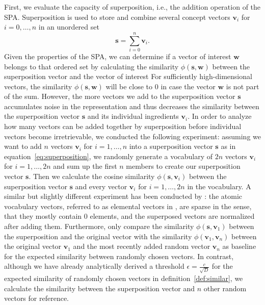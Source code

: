 First, we evaluate the capacity of superposition, i.e., the addition operation of the \ac{SPA}.
Superposition is used to store and combine several concept vectors $ \mathbf{v}_i$ for $i=0, \ldots, n$ in an unordered set
\begin{equation}
\label{eq:superposition}
\mathbf{s} = \sum\limits_{i=0}^{n} \mathbf{v}_{i}.
\end{equation}
Given the properties of the \ac{SPA}, we can determine if a vector of interest $\mathbf{w}$ belongs to that ordered set by calculating the similarity $\phi\left( \mathbf{s}, \mathbf{w}\right)$ between the superposition vector and the vector of interest
For sufficiently high-dimensional vectors, the similarity $\phi\left( \mathbf{s}, \mathbf{w}\right)$ will be close to \num{0} in case the vector $ \mathbf{w}$ is not part of the sum.
However, the more vectors we add to the superposition vector $ \mathbf{s}$ accumulates noise in the representation and thus decreases the similarity between the superposition vector $ \mathbf{s}$ and its individual ingredients $ \mathbf{v}_i$.
In order to analyze how many vectors can be added together by superposition before individual vectors become irretrievable, we conducted the following experiment: assuming we want to add $n$ vectors $ \mathbf{v}_i$ for $i=1, \ldots, n$ into a superposition vector $ \mathbf{s}$ as in equation~\eqref{eq:superposition}, we randomly generate a vocabulary of $2n$ vectors $ \mathbf{v}_i$ for $i=1, \ldots, 2n$ and sum up the first $n$ members to create our superposition vector $ \mathbf{s}$.
Then we calculate the cosine similarity $\phi\left(\mathbf{s}, \mathbf{v}_i\right)$ between the superposition vector $ \mathbf{s}$ and every vector $ \mathbf{v}_{i}$ for $i=1,\ldots, 2n$ in the vocabulary.
A similar but slightly different experiment has been conducted by \textcite{Wahle2012}: the atomic vocabulary vectors,  referred to as elemental vectors in \textcite{Wahle2012}, are sparse in the sense, that they mostly contain \num{0} elements, and the superposed vectors are normalized after adding them.
Furthermore, \textcite{Wahle2012} only compare the similarity $\phi\left(\mathbf{s}, \mathbf{v}_1\right)$ between the superposition and the original vector with the similarity $\phi\left(\mathbf{v}_1, \mathbf{v}_n\right)$ between the original vector $ \mathbf{v}_1$ and the most recently added random vector $ \mathbf{v}_{n}$ as baseline for the expected similarity between randomly chosen vectors.
In contrast, although we have already analytically derived a threshold $\epsilon= \tfrac{c}{\sqrt{D}}$ for the expected similarity of randomly chosen vectors in definition~\ref{def:similar}, we calculate the similarity between the superposition vector and $n$ other random vectors for reference.

